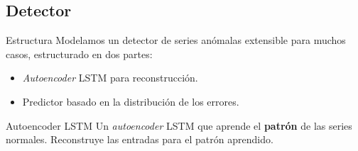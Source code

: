\documentclass[spanish]{beamer}
\begin{document}
\subsection{Detector}

\begin{frame}{Estructura}
  Modelamos un detector de series anómalas extensible para muchos casos, estructurado en dos partes:

  \begin{itemize}
    \item \emph{Autoencoder} LSTM para reconstrucción.
    \item Predictor basado en la distribución de los errores.
  \end{itemize}
\end{frame}

\begin{frame}{Autoencoder LSTM}
  Un \emph{autoencoder} LSTM que aprende el \textbf{patrón} de las series normales. Reconstruye las entradas para el patrón aprendido.


\end{frame}
\end{document}
